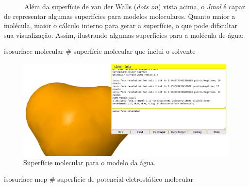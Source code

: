 \documentclass[
  letterpaper,
  DIV=11,
  numbers=noendperiod]{scrreprt}
\newenvironment{Shaded}{\begin{snugshade}}{\end{snugshade}}
\newcommand{\CommentTok}[1]{\textcolor[rgb]{0.37,0.37,0.37}{#1}}
\newcommand{\NormalTok}[1]{\textcolor[rgb]{0.00,0.23,0.31}{#1}}
\begin{document}
~~~~~~Além da superfície de van der Walls (\emph{dots on}) vista acima,
o \emph{Jmol} é capaz de representar algumas superfícies para modelos
moleculares. Quanto maior a molécula, maior o cálculo interno para gerar
a superfície, o que pode dificultar sua visualização. Assim, ilustrando
algumas superfícies para a molécula de água:

\begin{Shaded}
\begin{Highlighting}[]
\NormalTok{isosurface molecular }\CommentTok{\# superfície molecular que inclui o solvente}
\end{Highlighting}
\end{Shaded}

\begin{figure}[H]

{\centering \includegraphics{isosurfMolec.png}

}

\caption{Superfície molecular para o modelo da água.}

\end{figure}%

\begin{Shaded}
\begin{Highlighting}[]
\NormalTok{isosurface mep }\CommentTok{\# superfície de potencial eletrostático molecular}
\end{Highlighting}
\end{Shaded}
\end{document}

